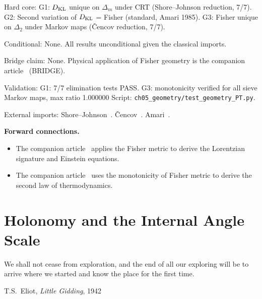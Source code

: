 \documentclass[12pt,a4paper]{article}
\begin{document}
\begin{ledgerbox}
Hard core:
  G1: $D_{\rm KL}$ unique on $\Delta_m$ under CRT (Shore--Johnson reduction, 7/7).
  G2: Second variation of $D_{\rm KL}$ = Fisher (standard, Amari 1985).
  G3: Fisher unique on $\Delta_2$ under Markov maps (\v{C}encov reduction, 7/7).

Conditional:
  None. All results unconditional given the classical imports.

Bridge claim:
  None. Physical application of Fisher geometry is the companion article~\cite{companion_physics} (BRIDGE).

Validation:
  G1: 7/7 elimination tests PASS.
  G3: monotonicity verified for all sieve Markov maps, max ratio 1.000000
  Script: \texttt{ch05\_geometry/test\_geometry\_PT.py}.

External imports:
  Shore--Johnson~\cite{ShoreJohnson1980}.
  \v{C}encov~\cite{Cencov1982}.
  Amari~\cite{Amari1985}.
\end{ledgerbox}

\medskip\noindent\textbf{Forward connections.}
\begin{itemize}
\item The companion article~\cite{companion_physics} applies the Fisher metric to derive the Lorentzian signature
  and Einstein equations.
\item The companion article~\cite{companion_physics} uses the monotonicity of Fisher metric to derive the
  second law of thermodynamics.
\end{itemize}


\newpage




\section{Holonomy and the Internal Angle Scale}
\label{sec:holonomy}

\epigraph{We shall not cease from exploration, and the end of all our
exploring will be to arrive where we started and know the place for
the first time.}{T.S.\ Eliot, \textit{Little Gidding}, 1942}
\end{document}
